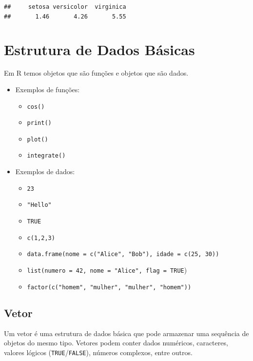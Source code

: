 \documentclass[
]{book}
\providecommand{\tightlist}{%
  \setlength{\itemsep}{0pt}\setlength{\parskip}{0pt}}
\theoremstyle{definition}
\theoremstyle{definition}
\theoremstyle{definition}
\theoremstyle{definition}
\theoremstyle{remark}
\begin{document}
\begin{verbatim}
##     setosa versicolor  virginica 
##       1.46       4.26       5.55
\end{verbatim}

\chapter{Estrutura de Dados Básicas}\label{estrutura-de-dados-buxe1sicas}

Em R temos objetos que são funções e objetos que são dados.

\begin{itemize}
\tightlist
\item
  Exemplos de funções:

  \begin{itemize}
  \tightlist
  \item
    \texttt{cos()}
  \item
    \texttt{print()}
  \item
    \texttt{plot()}
  \item
    \texttt{integrate()}
  \end{itemize}
\item
  Exemplos de dados:

  \begin{itemize}
  \tightlist
  \item
    \texttt{23}
  \item
    \texttt{"Hello"}
  \item
    \texttt{TRUE}
  \item
    \texttt{c(1,2,3)}
  \item
    \texttt{data.frame(nome\ =\ c("Alice",\ "Bob"),\ idade\ =\ c(25,\ 30))}
  \item
    \texttt{list(numero\ =\ 42,\ nome\ =\ "Alice",\ flag\ =\ TRUE})
  \item
    \texttt{factor(c("homem",\ "mulher",\ "mulher",\ "homem"))}
  \end{itemize}
\end{itemize}

\section{Vetor}\label{vetor}

Um vetor é uma estrutura de dados básica que pode armazenar uma sequência de objetos do mesmo tipo. Vetores podem conter dados numéricos, caracteres, valores lógicos (\texttt{TRUE}/\texttt{FALSE}), números complexos, entre outros.
\end{document}
